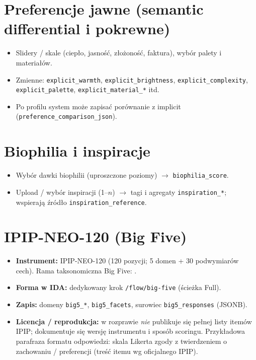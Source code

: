 \section{Preferencje jawne (semantic differential i pokrewne)}
\label{app:b:sec:explicit}

\begin{itemize}
  \item Slidery / skale (ciepło, jasność, złożoność, faktura), wybór palety i materiałów.
  \item Zmienne: \texttt{explicit\_warmth}, \texttt{explicit\_brightness}, \texttt{explicit\_complexity}, \texttt{explicit\_palette}, \texttt{explicit\_material\_*} itd.
  \item Po profilu system może zapisać porównanie z implicit (\texttt{preference\_comparison\_json}).
\end{itemize}

\section{Biophilia i inspiracje}
\label{app:b:sec:biophilia}

\begin{itemize}
  \item Wybór dawki biophilii (uproszczone poziomy) $\rightarrow$ \texttt{biophilia\_score}.
  \item Upload / wybór inspiracji (1--$n$) $\rightarrow$ tagi i agregaty \texttt{inspiration\_*}; wspierają źródło \texttt{inspiration\_reference}.
\end{itemize}

\section{IPIP-NEO-120 (Big Five)}
\label{app:b:sec:ipip}

\begin{itemize}
  \item \textbf{Instrument:} IPIP-NEO-120 (120 pozycji; 5 domen + 30 podwymiarów cech). Rama taksonomiczna Big Five: \cite{john2008bigfive}.
  \item \textbf{Forma w IDA:} dedykowany krok \texttt{/flow/big-five} (ścieżka Full).
  \item \textbf{Zapis:} domeny \texttt{big5\_*}, \texttt{big5\_facets}, surowiec \texttt{big5\_responses} (JSONB).
  \item \textbf{Licencja / reprodukcja:} w rozprawie \emph{nie} publikuje się pełnej listy itemów IPIP; dokumentuje się wersję instrumentu i sposób scoringu. Przykładowa parafraza formatu odpowiedzi: skala Likerta zgody z twierdzeniem o zachowaniu / preferencji (treść itemu wg oficjalnego IPIP).
\end{itemize}

